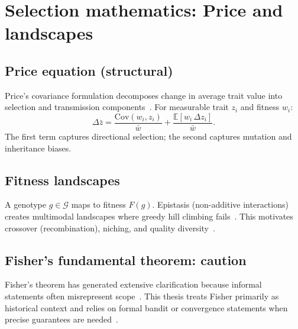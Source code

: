 \section{Selection mathematics: Price and landscapes}
\label{sec:selection}

\subsection{Price equation (structural)}
Price's covariance formulation decomposes change in average trait value into selection and transmission components~\cite{price1970selection,frank1995george}.
For measurable trait $z_i$ and fitness $w_i$:
\begin{equation}
  \Delta \bar{z}
  = \frac{\mathrm{Cov}(w_i,z_i)}{\bar{w}}
  + \frac{\mathbb{E}[w_i\,\Delta z_i]}{\bar{w}}.
\end{equation}
The first term captures directional selection; the second captures mutation and inheritance biases.

\subsection{Fitness landscapes}
A genotype $g\in\mathcal{G}$ maps to fitness $F(g)$.
Epistasis (non-additive interactions) creates multimodal landscapes where greedy hill climbing fails~\cite{mitchell1998introduction}.
This motivates crossover (recombination), niching, and quality diversity~\cite{deb2002fast,mouret2015illuminating}.

\subsection{Fisher's fundamental theorem: caution}
Fisher's theorem has generated extensive clarification because informal statements often misrepresent scope~\cite{fisher1930genetical}.
This thesis treats Fisher primarily as historical context and relies on formal bandit or convergence statements when precise guarantees are needed~\cite{lai1985asymptotically,auer2002finite}.
